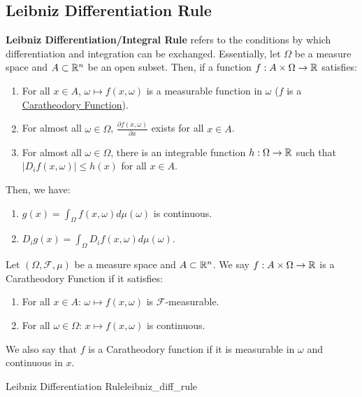 \subsection{Leibniz Differentiation Rule}
\label{sec:leib_diff_rule}

\textbf{Leibniz Differentiation/Integral Rule} refers to the conditions by which differentiation and integration can be exchanged. Essentially, let $\Omega$ be a measure space and $A\subset\mathbb{R}^n$ be an open subset. Then, if a function $f:A \times \Omega \to \mathbb{R}$ satisfies:
\begin{enumerate}
	\item For all $x\in A$, $\omega\mapsto f(x, \omega)$ is a measurable function in $\omega$ ($f$ is a \underline{Caratheodory Function}).	
	\item For almost all $\omega\in\Omega$, $\frac{\partial f(x, \omega)}{\partial x}$ exists for all $x\in A$.
	\item For almost all $\omega\in\Omega$, there is an integrable function $h:\Omega\to\mathbb{R}$ such that $|D_if(x, \omega)|\le h(x)$ for all $x\in A$.
\end{enumerate} 

\noindent Then, we have:
\begin{enumerate}
	\item $g(x) = \int_\Omega f(x, \omega)d\mu(\omega)$ is continuous.
	\item $D_i g(x) = \int_\Omega D_i f(x, \omega)d\mu(\omega)$.
\end{enumerate} 


\begin{definition}
	Let $(\Omega, \mathcal{F}, \mu)$ be a measure space and $A\subset\mathbb{R}^n$. We say $f: A \times \Omega \to \mathbb{R}$ is a Caratheodory Function if it satisfies:
	\begin{enumerate}
		\item For all $x\in A$: $\omega\mapsto f(x, \omega)$ is $\mathcal{F}$-measurable.	
		\item For all $\omega\in\Omega$: $x\mapsto f(x, \omega)$ is continuous.
	\end{enumerate}

	\noindent We also say that $f$ is a Caratheodory function if it is measurable in $\omega$ and continuous in $x$.
\end{definition} 

\begin{proposition}{Leibniz Differentiation Rule}{leibniz_diff_rule}
	
\end{proposition} 
